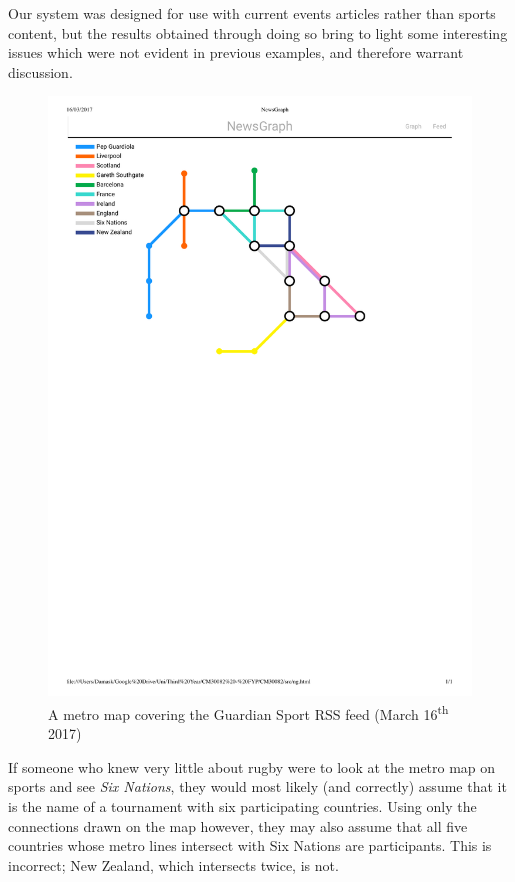 Our system was designed for use with current events articles rather than sports content, but the results obtained through doing so bring to light some interesting issues which were not evident in previous examples, and therefore warrant discussion.

\begin{figure}[htbp!]
	\centering
	\includegraphics[width=\textwidth]{img/results/guardian-sport.pdf}
	\caption{A metro map covering the Guardian Sport RSS feed (March 16\textsuperscript{th} 2017)}
	\label{fig:guardian-sport}
\end{figure}

If someone who knew very little about rugby were to look at the metro map on sports and see \textit{Six Nations}, they would most likely (and correctly) assume that it is the name of a tournament with six participating countries. Using only the connections drawn on the map however, they may also assume that all five countries whose metro lines intersect with Six Nations are participants. This is incorrect; New Zealand, which intersects twice, is not.

